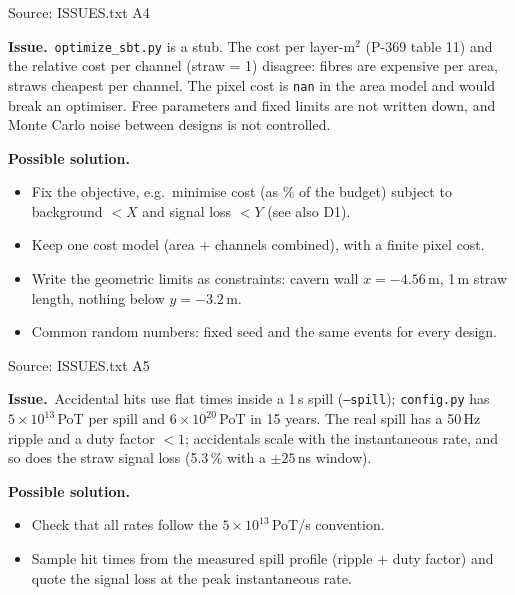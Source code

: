 \documentclass[10pt,a4paper]{article}
\newcommand{\st}[1]{\textbf{#1}}
\newcommand{\stOPEN}{\textcolor{shorange}{\st{OPEN}}}
\newenvironment{issue}[5]{%
  \begin{tcolorbox}[breakable,colback=white,colframe=cernblue,boxrule=0.6pt,arc=1.5mm,
    left=6pt,right=6pt,top=4pt,bottom=4pt,
    title={\textbf{#1}\quad #2\hfill{\normalfont\small priority #3\quad\colorbox{white}{#4}}},
    coltitle=white,colbacktitle=cernblue,fonttitle=\normalsize]
  {\color{greytxt}\footnotesize Source: #5}\par\smallskip}{\end{tcolorbox}\vspace{2pt}}
\newcommand{\prob}{\par\noindent\textbf{\color{cernblue}Issue.}\ }
\newcommand{\sol}{\par\smallskip\noindent\textbf{\color{shorange}Possible solution.}\ }
\begin{document}
\begin{issue}{A4}{No objective, two inconsistent cost models}{A}{\stOPEN}{ISSUES.txt A4}
\prob \texttt{optimize\_sbt.py} is a stub. The cost per layer-m$^2$ (P-369 table 11) and the relative cost per
channel (straw = 1) disagree: fibres are expensive per area, straws cheapest per channel. The pixel cost is
\texttt{nan} in the area model and would break an optimiser. Free parameters and fixed limits are not
written down, and Monte Carlo noise between designs is not controlled.
\sol
\begin{itemize}
\item Fix the objective, e.g.\ minimise cost (as \% of the budget) subject to background $<X$ and signal loss $<Y$
      (see also D1).
\item Keep one cost model (area + channels combined), with a finite pixel cost.
\item Write the geometric limits as constraints: cavern wall $x=-4.56$\,m, 1\,m straw length, nothing below
      $y=-3.2$\,m.
\item Common random numbers: fixed seed and the same events for every design.
\end{itemize}
\end{issue}

\begin{issue}{A5}{Spill and PoT normalisation}{A}{\stOPEN}{ISSUES.txt A5}
\prob Accidental hits use flat times inside a 1\,s spill (\texttt{--spill}); \texttt{config.py} has
$5\times10^{13}$\,PoT per spill and $6\times10^{20}$\,PoT in 15 years. The real spill has a 50\,Hz ripple and a
duty factor $<1$; accidentals scale with the instantaneous rate, and so does the straw signal loss
(5.3\,\% with a $\pm25$\,ns window).
\sol
\begin{itemize}
\item Check that all rates follow the $5\times10^{13}$\,PoT/s convention.
\item Sample hit times from the measured spill profile (ripple + duty factor) and quote the signal loss at the
      peak instantaneous rate.
\end{itemize}
\end{issue}
\end{document}
